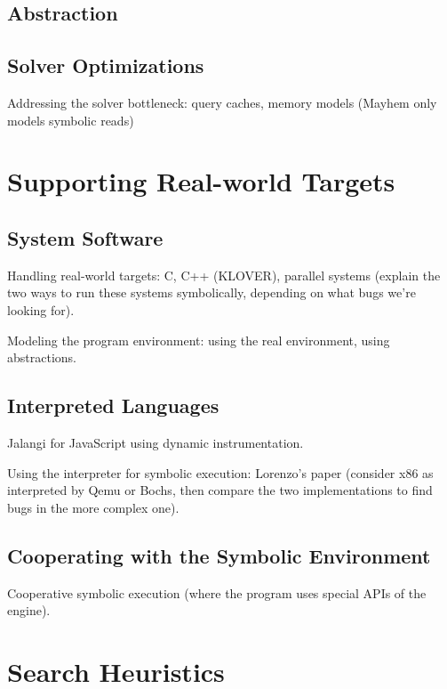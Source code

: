 \subsection{Abstraction}

\subsection{Solver Optimizations}

Addressing the solver bottleneck: query caches, memory models (Mayhem only models symbolic reads)


\section{Supporting Real-world Targets}

\subsection{System Software}

Handling real-world targets: C, C++ (KLOVER), parallel systems (explain the two ways to run these systems symbolically, depending on what bugs we're looking for).

Modeling the program environment: using the real environment, using abstractions.

\subsection{Interpreted Languages}

Jalangi for JavaScript using dynamic instrumentation.

Using the interpreter for symbolic execution: Lorenzo's paper (consider x86 as interpreted by Qemu or Bochs, then compare the two implementations to find bugs in the more complex one).

\subsection{Cooperating with the Symbolic Environment}

Cooperative symbolic execution (where the program uses special APIs of the engine).


\section{Search Heuristics}

